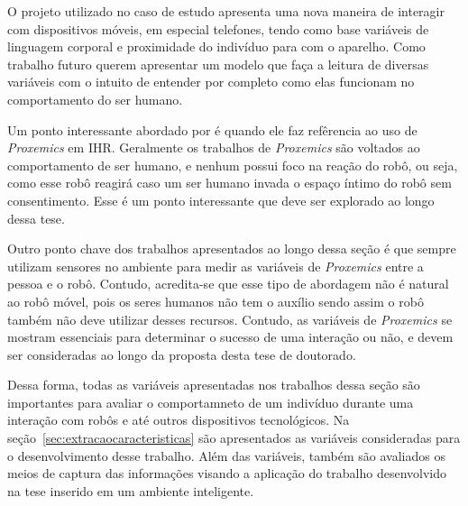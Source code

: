 O projeto utilizado no caso de estudo apresenta uma nova maneira de interagir com dispositivos móveis, em especial telefones, tendo como base variáveis de linguagem corporal e proximidade do indivíduo para com o aparelho. Como trabalho futuro  querem apresentar um modelo que faça a leitura de diversas variáveis com o intuito de entender por completo como elas funcionam no comportamento do ser humano.

Um ponto interessante abordado por  é quando ele faz refêrencia ao uso de \emph{Proxemics} em IHR. Geralmente os trabalhos de \emph{Proxemics} são voltados ao comportamento de ser humano, e nenhum possui foco na reação do robô, ou seja, como esse robô reagirá caso um ser humano invada o espaço íntimo do robô sem consentimento. Esse é um ponto interessante que deve ser explorado ao longo dessa tese. 

Outro ponto chave dos trabalhos apresentados ao longo dessa seção é que sempre utilizam sensores no ambiente para medir as variáveis de \emph{Proxemics} entre a pessoa e o robô. Contudo, acredita-se que esse tipo de abordagem não é natural ao robô móvel, pois os seres humanos não tem o auxílio sendo assim o robô também não deve utilizar desses recursos. Contudo, as variáveis de \emph{Proxemics} se mostram essenciais para determinar o sucesso de uma interação ou não, e devem ser consideradas ao longo da proposta desta tese de doutorado.

Dessa forma, todas as variáveis apresentadas nos trabalhos dessa seção são importantes para avaliar o comportamneto de um indivíduo durante uma interação com robôs e até outros dispositivos tecnológicos. Na seção~\ref{sec:extracaocaracteristicas} são apresentados as variáveis consideradas para o desenvolvimento desse trabalho. Além das variáveis, também são avaliados os meios de captura das informações visando a aplicação do trabalho desenvolvido na tese inserido em um ambiente inteligente.